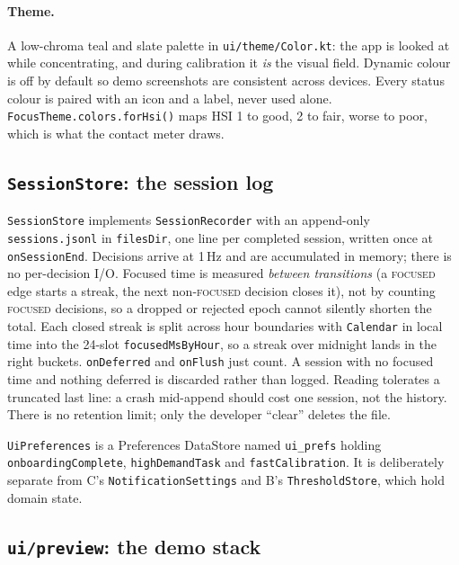 \documentclass[10pt,a4paper]{article}
\newcommand{\file}[1]{\texttt{\small #1}}          %
\newcommand{\code}[1]{\texttt{#1}}                  %
\newcommand{\state}[1]{\textsc{\small #1}}          %
\begin{document}
\paragraph{Theme.} A low-chroma teal and slate palette in \file{ui/theme/Color.kt}: the app is
looked at while concentrating, and during calibration it \emph{is} the visual field. Dynamic colour
is off by default so demo screenshots are consistent across devices. Every status colour is paired
with an icon and a label, never used alone. \code{FocusTheme.colors.forHsi()} maps HSI 1 to good,
2 to fair, worse to poor, which is what the contact meter draws.

\subsection{\code{SessionStore}: the session log}

\code{SessionStore} implements \code{SessionRecorder} with an append-only \code{sessions.jsonl}
in \code{filesDir}, one line per completed session, written once at \code{onSessionEnd}. Decisions
arrive at 1\,Hz and are accumulated in memory; there is no per-decision I/O. Focused time is
measured \emph{between transitions} (a \state{focused} edge starts a streak, the next
non-\state{focused} decision closes it), not by counting \state{focused} decisions, so a dropped or
rejected epoch cannot silently shorten the total. Each closed streak is split across hour
boundaries with \code{Calendar} in local time into the 24-slot \code{focusedMsByHour}, so a streak
over midnight lands in the right buckets. \code{onDeferred} and \code{onFlush} just count. A session
with no focused time and nothing deferred is discarded rather than logged. Reading tolerates a
truncated last line: a crash mid-append should cost one session, not the history. There is no
retention limit; only the developer ``clear'' deletes the file.

\code{UiPreferences} is a Preferences DataStore named \code{ui\_prefs} holding
\code{onboardingComplete}, \code{highDemandTask} and \code{fastCalibration}. It is deliberately
separate from C's \code{NotificationSettings} and B's \code{ThresholdStore}, which hold domain state.

\subsection{\code{ui/preview}: the demo stack}
\end{document}
